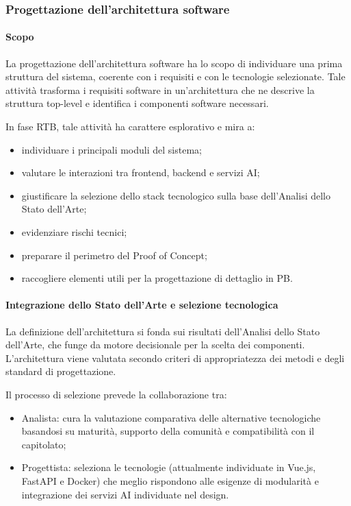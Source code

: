 
\subsubsection{Progettazione dell'architettura software}

\paragraph{Scopo}

La progettazione dell'architettura software ha lo scopo di individuare una prima
struttura del sistema, coerente con i requisiti e con le tecnologie selezionate.
Tale attività trasforma i requisiti software in un'architettura
che ne descrive la struttura top-level e identifica i componenti software necessari.

In fase RTB, tale attività ha carattere esplorativo e mira a:

\begin{itemize}
    \item individuare i principali moduli del sistema;
    \item valutare le interazioni tra frontend, backend e servizi AI;
    \item giustificare la selezione dello stack tecnologico sulla base dell'Analisi dello Stato dell'Arte;
    \item evidenziare rischi tecnici;
    \item preparare il perimetro del Proof of Concept;
    \item raccogliere elementi utili per la progettazione di dettaglio in PB.
\end{itemize}

\paragraph{Integrazione dello Stato dell'Arte e selezione tecnologica}

La definizione dell'architettura si fonda sui risultati dell'Analisi dello Stato dell'Arte,
che funge da motore decisionale per la scelta dei componenti. L'architettura viene valutata secondo criteri di appropriatezza
dei metodi e degli standard di progettazione.

Il processo di selezione prevede la collaborazione tra:

\begin{itemize}
    \item Analista: cura la valutazione comparativa delle alternative tecnologiche basandosi su maturità, supporto della comunità e compatibilità con il capitolato;
    \item Progettista: seleziona le tecnologie (attualmente individuate in Vue.js, FastAPI e Docker) che meglio rispondono alle esigenze di modularità e integrazione dei servizi AI individuate nel design.
\end{itemize}

